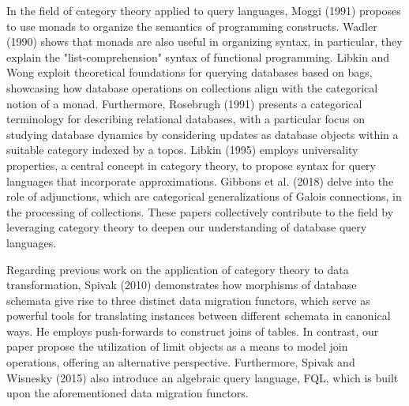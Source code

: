 



In the field of category theory applied to query languages, Moggi (1991) \cite{moggi1991notions} proposes to use monads to organize the semantics of programming constructs. Wadler \cite{wadler1990comprehending} (1990) shows that monads are also useful in organizing syntax, in particular, they explain the
"list-comprehension" syntax of functional programming. Libkin and Wong \cite{journals/jcss/LibkinW97} exploit theoretical foundations for querying databases based on bags, showcasing how database operations on collections align with the categorical notion of a monad. Furthermore, Rosebrugh (1991) \cite{rosebrugh1991relational} presents a categorical terminology for describing relational databases, with a particular focus on studying database dynamics by considering updates as database objects within a suitable category indexed by a topos. Libkin (1995) \cite{DBLP:conf/icdt/Libkin95} employs universality properties, a central concept in category theory, to propose syntax for query languages that incorporate approximations.  Gibbons et al. (2018) \cite{journals/pacmpl/GibbonsHHW18} delve into the role of adjunctions, which are categorical generalizations of Galois connections, in the processing of collections. These papers collectively contribute to the field by leveraging category theory to  deepen our understanding of database query languages.



Regarding previous work on the application of category theory to data transformation,  Spivak (2010) \cite{DBLP:journals/corr/abs-1009-1166} demonstrates how morphisms of database schemata give rise to three distinct data migration functors, which serve as powerful tools for translating instances between different schemata in canonical ways. He employs push-forwards to construct joins of tables. In contrast, our paper propose the utilization of limit objects as a means to model join operations, offering an alternative perspective. Furthermore, Spivak and Wisnesky (2015) \cite{conf/dbpl/SpivakW15}  also introduce an algebraic query language, FQL, which is built upon the aforementioned data migration functors.


